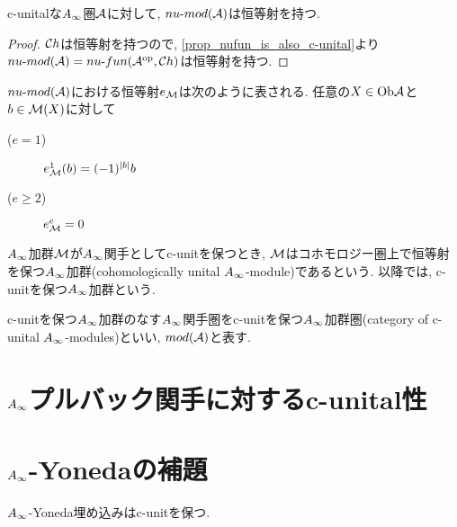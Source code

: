 \documentclass[uplatex, a4paper, 14Q, dvipdfmx]{jsarticle}
\begin{document}
\begin{lemma}
  c-unitalな$A_{\infty}$圏$\mathcal{A}$に対して, $nu \text{-} mod (\mathcal{A})$は恒等射を持つ. 
\end{lemma}

\begin{proof}
  $\mathcal{C} h$は恒等射を持つので, \cref{prop_nufun_is_also_c-unital}より$nu \text{-} mod (\mathcal{A}) = nu \text{-} fun (\mathcal{A}^\mathrm{op}, \mathcal{C} h)$は恒等射を持つ. 
\end{proof}

\begin{remark}
  $nu \text{-} mod (\mathcal{A})$における恒等射$e_{\mathcal{M}}$は次のように表される. %
  任意の$X \in \mathrm{Ob}\mathcal{A}$と$b \in \mathcal{M}(X)$に対して
  \begin{description}
    \item[($e=1$)] $e^1_{\mathcal{M}}(b) = (-1)^{|b|}b$
    \item[($e \geq 2$)] $e^e_{\mathcal{M}} = 0$
  \end{description}
\end{remark}

\begin{definition}
  $A_{\infty}$加群$\mathcal{M}$が$A_{\infty}$関手としてc-unitを保つとき, $\mathcal{M}$はコホモロジー圏上で恒等射を保つ$A_{\infty}$加群(cohomologically unital $A_{\infty}$-module)であるという. 
  以降では, c-unitを保つ$A_{\infty}$加群という. 
\end{definition}

\begin{remark}
  
\end{remark}

\begin{definition}
  c-unitを保つ$A_{\infty}$加群のなす$A_{\infty}$関手圏をc-unitを保つ$A_{\infty}$加群圏(category of c-unital $A_{\infty}$-modules)といい, $mod (\mathcal{A})$と表す. 
\end{definition}

\section{\texorpdfstring{$A_{\infty}$}{Ainf}プルバック関手に対するc-unital性}

\section{\texorpdfstring{$A_{\infty}$}{Ainf}-Yonedaの補題}

\begin{lemma}
  $A_{\infty}$-Yoneda埋め込みはc-unitを保つ. 
\end{lemma}
\end{document}
